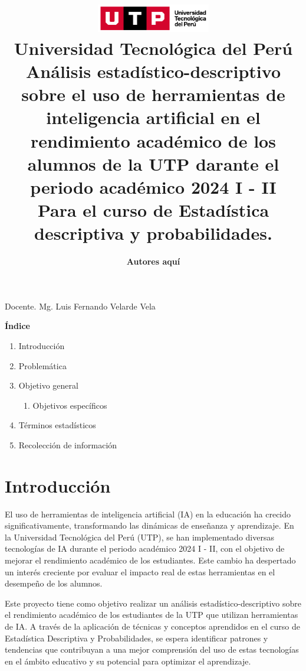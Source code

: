 \documentclass{article}
\title{
  \includegraphics[width=5cm]{./assets/logo-utp.png} \\
  \vspace{1cm}
  \textbf{Universidad Tecnológica del Perú} \\
  \vspace{2cm}
  \textbf{Análisis estadístico-descriptivo sobre el uso de herramientas de inteligencia artificial en el rendimiento académico de los alumnos de la UTP darante el periodo académico 2024 I - II} \\
  \vspace{1cm}
  \large \textbf{Para el curso de Estadística descriptiva y probabilidades.}
}
\author{
  \textbf{Autores aquí} \\
}
\begin{document}
\maketitle

\begin{center}
  Docente. Mg. Luis Fernando Velarde Vela  
\end{center}
\restoregeometry

\newpage

\begin{center}
  \textbf{\Large Índice}
\end{center}
\vspace{0.5cm} %

\begin{spacing}{1.15} %
  \noindent
  \begin{enumerate}
    \item Introducción
    \item Problemática
    \item Objetivo general
    \begin{enumerate}
      \item Objetivos específicos
    \end{enumerate}
    \item Términos estadísticos
    \item Recolección de información
  \end{enumerate}
\end{spacing}

\newpage
\vspace*{\fill}
\section{Introducción}
El uso de herramientas de inteligencia artificial (IA) en la educación ha crecido significativamente, transformando las dinámicas de enseñanza y aprendizaje. En la Universidad Tecnológica del Perú (UTP), se han implementado diversas tecnologías de IA durante el periodo académico 2024 I - II, con el objetivo de mejorar el rendimiento académico de los estudiantes. Este cambio ha despertado un interés creciente por evaluar el impacto real de estas herramientas en el desempeño de los alumnos.

Este proyecto tiene como objetivo realizar un análisis estadístico-descriptivo sobre el rendimiento académico de los estudiantes de la UTP que utilizan herramientas de IA. A través de la aplicación de técnicas y conceptos aprendidos en el curso de Estadística Descriptiva y Probabilidades, se espera identificar patrones y tendencias que contribuyan a una mejor comprensión del uso de estas tecnologías en el ámbito educativo y su potencial para optimizar el aprendizaje.
\vspace*{\fill}
\end{document}

